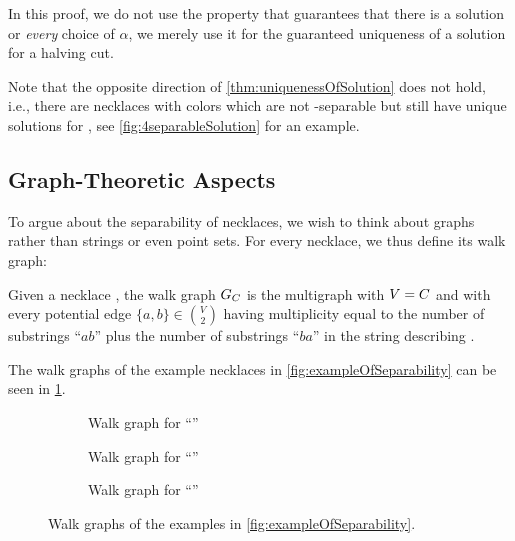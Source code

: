 \documentclass[a4paper,UKenglish,cleveref, thm-restate]{lipics-v2021}
\begin{document}
In this proof, we do not use the property that  guarantees that there is a solution or \emph{every} choice of $\alpha$, we merely use it for the guaranteed uniqueness of a solution for a halving cut.

Note that the opposite direction of \cref{thm:uniquenessOfSolution} does not hold, i.e., there are necklaces with \dimension colors which are not \dimension-separable but still have unique solutions for \TwoThiefNecklaceSplitting, see \cref{fig:4separableSolution} for an example.

\subsection{Graph-Theoretic Aspects}

To argue about the separability of necklaces, we wish to think about graphs rather than strings or even point sets. For every necklace, we thus define its walk graph:
\begin{definition}
Given a necklace \Colors, the walk graph $G_\Colors$ is the multigraph with $V=\Colors$ and with every potential edge $\{a,b\}\in \binom{V}{2}$ having multiplicity equal to the number of substrings ``$ab$'' plus the number of substrings ``$ba$'' in the string describing \Colors.
\end{definition}

The walk graphs of the example necklaces in \cref{fig:exampleOfSeparability} can be seen in \cref{fig:WalkGraphExample}.

\begin{figure}[h!]
\begin{subfigure}[b]{0.3\textwidth}
\centering
{}
\caption{Walk graph for ``\nodeA \nodeB \nodeC \nodeA''}
\end{subfigure}
\begin{subfigure}[b]{0.3\textwidth}
\centering
{}
\caption{Walk graph for ``\nodeA \nodeB \nodeA \nodeC''}
\end{subfigure}
\begin{subfigure}[b]{0.3\textwidth}
\centering
{}
\caption{Walk graph for ``\nodeA \nodeB \nodeA \nodeB \nodeC''}
\end{subfigure}
\caption{Walk graphs of the examples in \cref{fig:exampleOfSeparability}.}
\label{fig:WalkGraphExample}
\end{figure}
\end{document}
